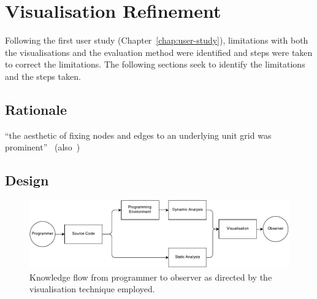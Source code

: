 
\chapter{Visualisation Refinement}
\label{chap:visualisation-refinement}

Following the first user study (Chapter~\ref{chap:user-study}), limitations with both the visualisations and the evaluation method were identified and steps were taken to correct the limitations. The following sections seek to identify the limitations and the steps taken.

\section{Rationale}

``the aesthetic of fixing nodes and edges to an underlying unit grid was prominent''~\cite{Purchase2014} (also~\cite{Purchase2001,Purchase1996})

\section{Design}

\begin{figure}
  \centering \includegraphics[width=\columnwidth]{../images/diagrams/knowledge-flow-refined.pdf}
  \caption{Knowledge flow from programmer to observer as directed by the visualisation technique employed.}
\label{fig:knowledge-flow-refined}
\end{figure}

